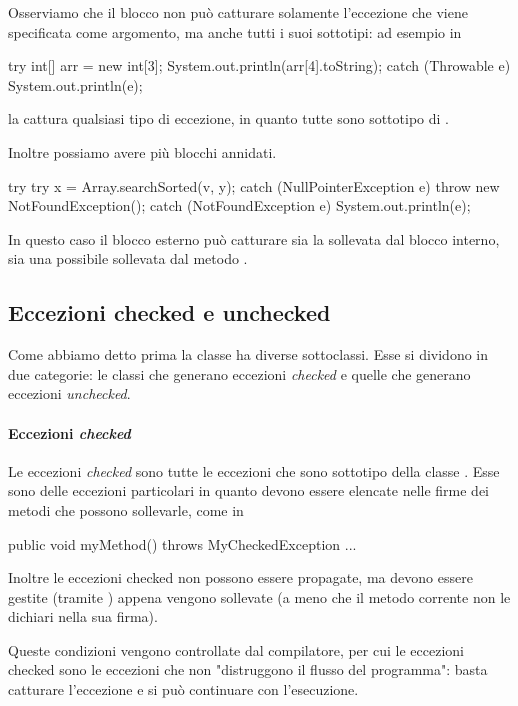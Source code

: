 Osserviamo che il blocco  non può catturare solamente l'eccezione che viene specificata come argomento, ma anche tutti i suoi sottotipi: ad esempio in
\begin{Java}
    try {
        int[] arr = new int[3];
        System.out.println(arr[4].toString);
    } catch (Throwable e) {
        System.out.println(e);
    }
\end{Java}
la  cattura qualsiasi tipo di eccezione, in quanto tutte sono sottotipo di .

Inoltre possiamo avere più blocchi  annidati.
\begin{Java}
    try {
        try {
            x = Array.searchSorted(v, y);
        } catch (NullPointerException e) {
            throw new NotFoundException();
        }
    } catch (NotFoundException e) {
        System.out.println(e);
    }
\end{Java}
In questo caso il blocco  esterno può catturare sia la  sollevata dal blocco  interno, sia una possibile  sollevata dal metodo .

\subsection{Eccezioni checked e unchecked}
Come abbiamo detto prima la classe  ha diverse sottoclassi. Esse si dividono in due categorie: le classi che generano eccezioni \emph{checked} e quelle che generano eccezioni \emph{unchecked}.

\paragraph{Eccezioni \emph{checked}} Le eccezioni \emph{checked} sono tutte le eccezioni che sono sottotipo della classe . Esse sono delle eccezioni particolari in quanto devono essere elencate nelle firme dei metodi che possono sollevarle, come in \begin{Java}
public void myMethod() throws MyCheckedException { ... }
\end{Java}
Inoltre le eccezioni checked non possono essere propagate, ma devono essere gestite (tramite ) appena vengono sollevate (a meno che il metodo corrente non le dichiari nella sua firma).

Queste condizioni vengono controllate dal compilatore, per cui le eccezioni checked sono le eccezioni che non "distruggono il flusso del programma": basta catturare l'eccezione e si può continuare con l'esecuzione.

